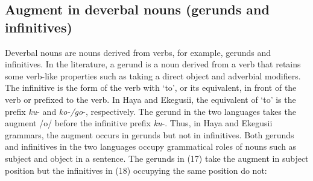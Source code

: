 \documentclass[output=paper]{langscibook}
\begin{document}
\subsection{Augment in deverbal nouns (gerunds and infinitives)}
	Deverbal nouns are nouns derived from verbs, for example, gerunds and infinitives. In the literature, a gerund is a noun derived from a verb that retains some verb-like properties such as taking a direct object and adverbial modifiers. The infinitive is the form of the verb with ‘to’, or its equivalent, in front of the verb or prefixed to the verb. In Haya and Ekegusii, the equivalent of ‘to’ is the prefix \textit{ku}- and \textit{ko-/go}-, respectively. The gerund in the two languages takes the augment /o/ before the infinitive prefix \textit{ku}-. Thus, in Haya and Ekegusii grammars, the augment occurs in gerunds but not in infinitives. Both gerunds and infinitives in the two languages occupy grammatical roles of nouns such as subject and object in a sentence. The gerunds in (17) take the augment in subject position but the infinitives in (18) occupying the same position do not: 
\end{document}
